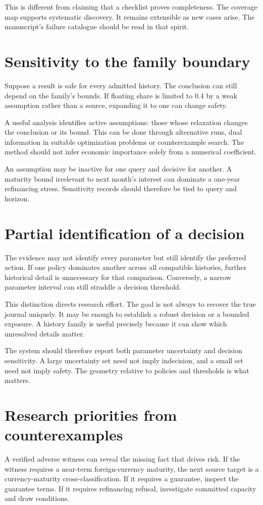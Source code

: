 This is different from claiming that a checklist proves completeness. The coverage map supports systematic discovery. It remains extensible as new cases arise. The manuscript's failure catalogue should be read in that spirit.

\section{Sensitivity to the family boundary}
Suppose a result is safe for every admitted history. The conclusion can still depend on the family's bounds. If floating share is limited to 0.4 by a weak assumption rather than a source, expanding it to one can change safety.

A useful analysis identifies active assumptions: those whose relaxation changes the conclusion or its bound. This can be done through alternative runs, dual information in suitable optimization problems or counterexample search. The method should not infer economic importance solely from a numerical coefficient.

An assumption may be inactive for one query and decisive for another. A maturity bound irrelevant to next month's interest can dominate a one-year refinancing stress. Sensitivity records should therefore be tied to query and horizon.

\section{Partial identification of a decision}
The evidence may not identify every parameter but still identify the preferred action. If one policy dominates another across all compatible histories, further historical detail is unnecessary for that comparison. Conversely, a narrow parameter interval can still straddle a decision threshold.

This distinction directs research effort. The goal is not always to recover the true journal uniquely. It may be enough to establish a robust decision or a bounded exposure. A history family is useful precisely because it can show which unresolved details matter.

The system should therefore report both parameter uncertainty and decision sensitivity. A large uncertainty set need not imply indecision, and a small set need not imply safety. The geometry relative to policies and thresholds is what matters.

\section{Research priorities from counterexamples}
A verified adverse witness can reveal the missing fact that drives risk. If the witness requires a near-term foreign-currency maturity, the next source target is a currency-maturity cross-classification. If it requires a guarantee, inspect the guarantee terms. If it requires refinancing refusal, investigate committed capacity and draw conditions.

